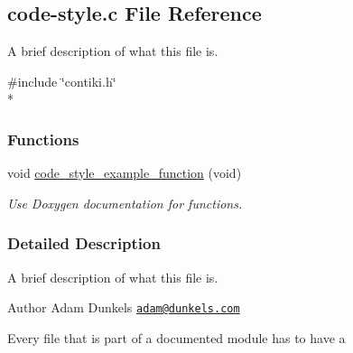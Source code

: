 \hypertarget{a00001}{}\subsection{code-\/style.c File Reference}
\label{a00001}


\begin{DoxyVerb}    A brief description of what this file is.\end{DoxyVerb}
  


{\ttfamily \#include \char`\"{}contiki.\+h\char`\"{}}\\*
\subsubsection*{Functions}
\begin{DoxyCompactItemize}
\item 
void \hyperlink{a00077_gaf4091e5d6984567763b6f5b792d2407f}{code\+\_\+style\+\_\+example\+\_\+function} (void)
\begin{DoxyCompactList}\small\item\em Use Doxygen documentation for functions. \end{DoxyCompactList}\end{DoxyCompactItemize}


\subsubsection{Detailed Description}
\begin{DoxyVerb}    A brief description of what this file is.\end{DoxyVerb}
 

\begin{DoxyAuthor}{Author}
Adam Dunkels \href{mailto:adam@dunkels.com}{\tt adam@dunkels.\+com}
\end{DoxyAuthor}
Every file that is part of a documented module has to have a 